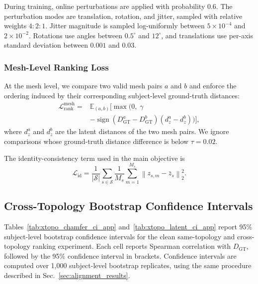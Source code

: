 During training, online perturbations are applied with probability 0.6. The
perturbation modes are translation, rotation, and jitter, sampled with relative
weights $4{:}2{:}1$. Jitter magnitude is sampled log-uniformly between
$5\times10^{-4}$ and $2\times10^{-2}$. Rotations use angles between
$0.5^\circ$ and $12^\circ$, and translations use per-axis standard deviation
between $0.001$ and $0.03$.
\subsubsection{Mesh-Level Ranking Loss}
\label{app:mesh_level_ranking_loss}

At the mesh level, we compare two valid mesh pairs $a$ and $b$ and enforce the
ordering induced by their corresponding subject-level ground-truth distances:
\begin{equation}
\begin{split}
\mathcal L^{\mathrm{mesh}}_{\mathrm{rank}}
={}&
\mathbb E_{(a,b)}
\Big[
\max
\Big(
0,\;
\gamma
\\
&-
\operatorname{sign}
\left(
D_{\mathrm{GT}}^a-D_{\mathrm{GT}}^b
\right)
\left(
d_z^a-d_z^b
\right)
\Big)
\Big],
\end{split}
\end{equation}
where $d_z^a$ and $d_z^b$ are the latent distances of the two mesh pairs. We
ignore comparisons whose ground-truth distance difference is below $\tau=0.02$.

The identity-consistency term used in the main objective is
\begin{equation}
\mathcal L_{\mathrm{id}}
=
\frac{1}{|\mathcal S|}
\sum_{s\in\mathcal S}
\frac{1}{M_s}
\sum_{m=1}^{M_s}
\left\|
z_{s,m}-\bar z_s
\right\|_2^2 .
\end{equation}

\subsection{Cross-Topology Bootstrap Confidence Intervals}
\label{app:xtopo_bootstrap_ci}

Tables~\ref{tab:xtopo_chamfer_ci_app} and~\ref{tab:xtopo_latent_ci_app}
report 95\% subject-level bootstrap confidence intervals for the clean
same-topology and cross-topology ranking experiment. Each cell reports Spearman
correlation with $D_{\mathrm{GT}}$, followed by the 95\% confidence interval in
brackets. Confidence intervals are computed over 1,000 subject-level bootstrap
replicates, using the same procedure described in Sec.~\ref{sec:alignment_results}.

